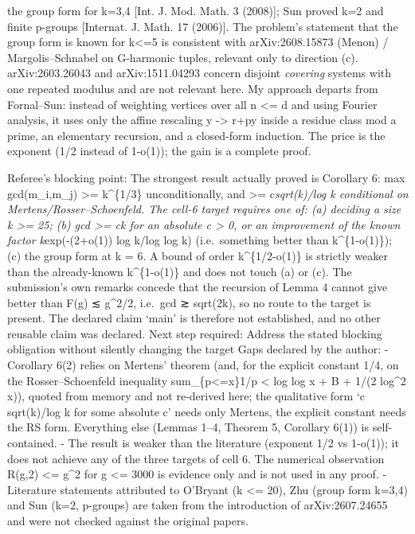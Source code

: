 \begin{itemize}
  the group form for k=3,4 {[}Int. J. Mod. Math. 3 (2008){]}; Sun proved
  k=2 and finite p-groups {[}Internat. J. Math. 17 (2006){]}. The
  problem's statement that the group form is known for k\textless=5 is
  consistent with arXiv:2608.15873 (Menon) / Margolis--Schnabel on
  G-harmonic tuples, relevant only to direction (c). arXiv:2603.26043
  and arXiv:1511.04293 concern disjoint \emph{covering} systems with one
  repeated modulus and are not relevant here. My approach departs from
  Fornal--Sun: instead of weighting vertices over all n \textless= d and
  using Fourier analysis, it uses only the affine rescaling y
  -\textgreater{} r+py inside a residue class mod a prime, an elementary
  recursion, and a closed-form induction. The price is the exponent (1/2
  instead of 1-o(1)); the gain is a complete proof.
\end{itemize}


Referee's blocking point: The strongest result actually proved is
Corollary 6: max gcd(m\_i,m\_j) \textgreater= k\^{}\{1/3\}
unconditionally, and \textgreater= c\emph{sqrt(k)/log k conditional on
Mertens/Rosser--Schoenfeld. The cell-6 target requires one of: (a)
deciding a size k \textgreater= 25; (b) gcd \textgreater= ck for an
absolute c \textgreater{} 0, or an improvement of the known factor
k}exp(-(2+o(1)) log k/log log k) (i.e.~something better than
k\^{}\{1-o(1)\}); (c) the group form at k = 6. A bound of order
k\^{}\{1/2-o(1)\} is strictly weaker than the already-known
k\^{}\{1-o(1)\} and does not touch (a) or (c). The submission's own
remarks concede that the recursion of Lemma 4 cannot give better than
F(g) ≲ g\^{}2/2, i.e.~gcd ≳ sqrt(2k), so no route to the target is
present. The declared claim `main' is therefore not established, and no
other reusable claim was declared. Next step required: Address the
stated blocking obligation without silently changing the target Gaps
declared by the author: - Corollary 6(2) relies on Mertens' theorem
(and, for the explicit constant 1/4, on the Rosser--Schoenfeld
inequality sum\_\{p\textless=x\}1/p \textless{} log log x + B + 1/(2
log\^{}2 x)), quoted from memory and not re-derived here; the
qualitative form `c sqrt(k)/log k for some absolute c' needs only
Mertens, the explicit constant needs the RS form. Everything else
(Lemmas 1--4, Theorem 5, Corollary 6(1)) is self-contained. - The result
is weaker than the literature (exponent 1/2 vs 1-o(1)); it does not
achieve any of the three targets of cell 6. The numerical observation
R(g,2) \textless= g\^{}2 for g \textless= 3000 is evidence only and is
not used in any proof. - Literature statements attributed to O'Bryant (k
\textless= 20), Zhu (group form k=3,4) and Sun (k=2, p-groups) are taken
from the introduction of arXiv:2607.24655 and were not checked against
the original papers.

